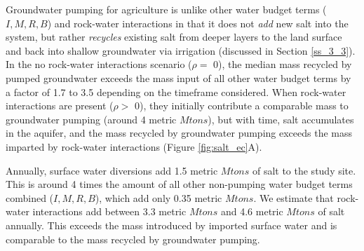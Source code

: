 Groundwater pumping for agriculture is unlike other water budget terms ($I, M, R, B$) and rock-water interactions in that it does not \textit{add} new salt into the system, but rather \textit{recycles} existing salt from deeper layers to the land surface and back into shallow groundwater via irrigation (discussed in Section \ref{ss_3_3}). In the no rock-water interactions scenario ($\rho = $ 0), the median mass recycled by pumped groundwater exceeds the mass input of all other water budget terms by a factor of 1.7 to 3.5
depending on the timeframe considered. When rock-water interactions are present ($\rho > $ 0), they initially contribute a comparable mass to groundwater pumping (around 4 metric $Mtons$), but with time, salt accumulates in the aquifer, and the mass recycled by groundwater pumping exceeds the mass imparted by rock-water interactions (Figure \ref{fig:salt_ec}A). 

Annually, surface water diversions add 1.5 
metric $Mtons$ of salt to the study site. This is around 4
times the amount of all other non-pumping water budget terms combined ($I, M, R, B$), which add only 0.35 
metric $Mtons$. We estimate that rock-water interactions add between 3.3 metric $Mtons$ and 4.6
metric $Mtons$ of salt annually. This exceeds the mass introduced by imported surface water and is comparable to the mass recycled by groundwater pumping. 


